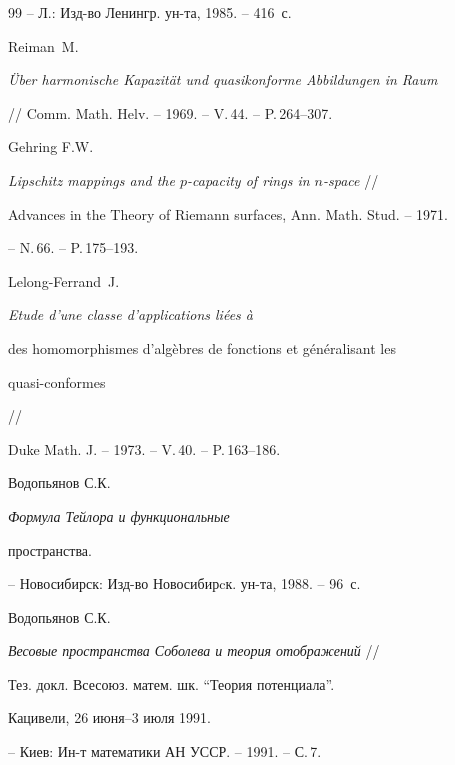 \begin{thebibliography}{99}
-- Л.: Изд-во Ленингр. ун-та, 1985. -- 416~с.







Reiman~M.


{\it \"Uber harmonische Kapazit\"at und quasikonforme Abbildungen in Raum}


// Comm. Math. Helv. -- 1969. -- V.\,44. -- P.\,264--307.







Gehring F.W.


{\it Lipschitz mappings and the $p$-capacity of rings in $n$-space} //


Advances in the Theory of Riemann surfaces, Ann. Math. Stud. -- 1971.


-- N.\,66. -- P.\,175--193. %







Lelong-Ferrand~J.


{\it Etude d'une classe d'applications li\'{e}es \`{a}


des homomorphismes d'alg\`{e}bres de fonctions et g\'{e}n\'{e}ralisant les


quasi-conformes} //


Duke Math. J. -- 1973. -- V.\,40. -- P.\,163--186.







Водопьянов С.К. {\it Формула Тейлора и функциональные


пространства.} -- Новосибирск: Изд-во Новосибирcк. ун-та, 1988. -- 96~с.







Водопьянов С.К.


{\it Весовые пространства Соболева и теория отображений} //


Тез. докл. Всесоюз. матем. шк. ``Теория потенциала''.


Кацивели, 26 июня--3 июля 1991.


-- Киев: Ин-т математики АН УССР. -- 1991. -- С.\,7.








\end{thebibliography}
